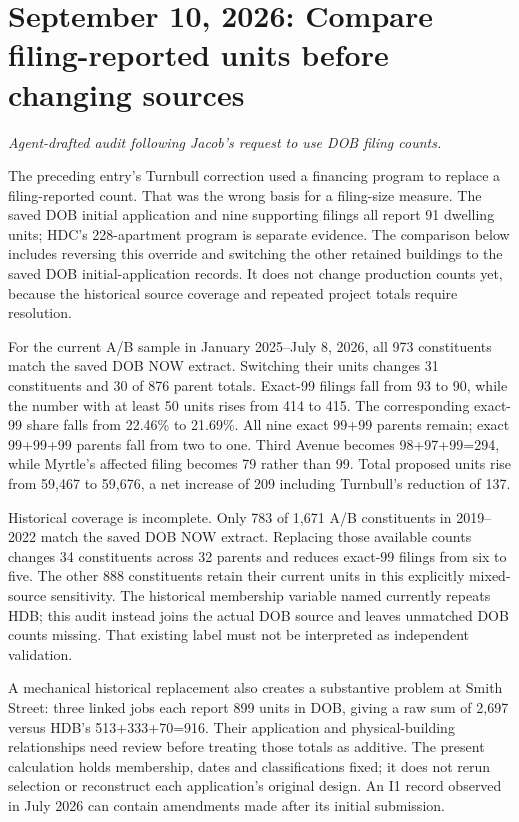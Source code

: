 \clearpage
\section*{September 10, 2026: Compare filing-reported units before changing sources}
\textit{Agent-drafted audit following Jacob's request to use DOB filing counts.}

The preceding entry's Turnbull correction used a financing program to replace a filing-reported count. That was the wrong basis for a filing-size measure. The saved DOB initial application and nine supporting filings all report 91 dwelling units; HDC's 228-apartment program is separate evidence. The comparison below includes reversing this override and switching the other retained buildings to the saved DOB initial-application records. It does not change production counts yet, because the historical source coverage and repeated project totals require resolution.

For the current A/B sample in January 2025--July 8, 2026, all 973 constituents match the saved DOB NOW extract. Switching their units changes 31 constituents and 30 of 876 parent totals. Exact-99 filings fall from 93 to 90, while the number with at least 50 units rises from 414 to 415. The corresponding exact-99 share falls from 22.46\% to 21.69\%. All nine exact 99+99 parents remain; exact 99+99+99 parents fall from two to one. Third Avenue becomes 98+97+99=294, while Myrtle's affected filing becomes 79 rather than 99. Total proposed units rise from 59,467 to 59,676, a net increase of 209 including Turnbull's reduction of 137.

Historical coverage is incomplete. Only 783 of 1,671 A/B constituents in 2019--2022 match the saved DOB NOW extract. Replacing those available counts changes 34 constituents across 32 parents and reduces exact-99 filings from six to five. The other 888 constituents retain their current units in this explicitly mixed-source sensitivity. The historical membership variable named  currently repeats HDB; this audit instead joins the actual DOB source and leaves unmatched DOB counts missing. That existing label must not be interpreted as independent validation.

A mechanical historical replacement also creates a substantive problem at Smith Street: three linked jobs each report 899 units in DOB, giving a raw sum of 2,697 versus HDB's 513+333+70=916. Their application and physical-building relationships need review before treating those totals as additive. The present calculation holds membership, dates and classifications fixed; it does not rerun selection or reconstruct each application's original design. An I1 record observed in July 2026 can contain amendments made after its initial submission.

